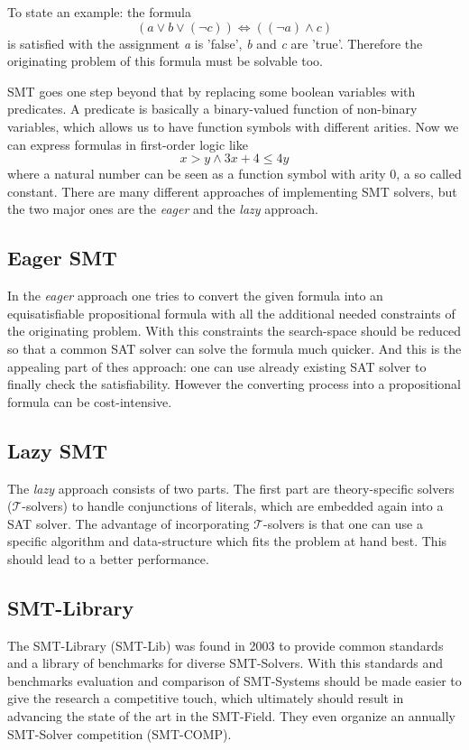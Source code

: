 To state an example: the formula
\[(a \lor b \lor (\neg c)) \iff ((\neg a) \land c)\]
is satisfied with the assignment \textit{a} is 'false', \textit{b} and \textit{c} are 'true'. Therefore the originating problem of this formula must be solvable too.

SMT goes one step beyond that by replacing some boolean variables with predicates. A predicate is basically a binary-valued function of non-binary variables, which allows us to have function symbols with different arities. Now we can express formulas in first-order logic like
\[x > y \land 3 x + 4 \leq 4 y\]
where a natural number can be seen as a function symbol with arity 0, a so called constant.
There are many different approaches of implementing SMT solvers, but the two major ones are the \textit{eager} and the \textit{lazy} approach.

\subsection{Eager SMT}
In the \textit{eager} approach one tries to convert the given formula into an equisatisfiable propositional formula with all the additional needed constraints of the originating problem. With this constraints the search-space should be reduced so that a common SAT solver can solve the formula much quicker. And this is the appealing part of thes approach: one can use already existing SAT solver to finally check the satisfiability. However the converting process into a propositional formula can be cost-intensive.\cite{2009satisfiability}

\subsection{Lazy SMT}
The \textit{lazy} approach consists of two parts. The first part are theory-specific solvers ($\mathcal{T}$-solvers) to handle conjunctions of literals, which are embedded again into a SAT solver. The advantage of incorporating $\mathcal{T}$-solvers is that one can use a specific algorithm and data-structure which fits the problem at hand best. This should lead to a better performance.\cite{sebastiani2007lazy}

\subsection{SMT-Library}
The SMT-Library (SMT-Lib) was found in 2003 to provide common standards and a library of benchmarks for diverse SMT-Solvers. With this standards and benchmarks evaluation and comparison of SMT-Systems should be made easier to give the research a competitive touch, which ultimately should result in advancing the state of the art in the SMT-Field. They even organize an annually SMT-Solver competition (SMT-COMP).

